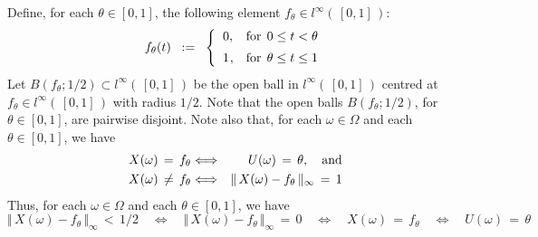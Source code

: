 \proof
Define, for each $\theta \in [0,1]$, the following element $f_{\theta} \in l^{\infty}(\,[0,1]\,)$:
\begin{equation*}
f_{\theta}(t)
\;\; := \;\;
	\left\{\begin{array}{cc}
	0, & \textnormal{for} \;\, 0 \leq t < \theta
	\\
	\overset{{\color{white}+}}{1}, & \textnormal{for} \;\, \theta \leq t \leq 1
	\end{array}\right.
\end{equation*}
Let $B(f_{\theta};1/2) \subset l^{\infty}(\,[0,1]\,)$ be the open ball in $l^{\infty}(\,[0,1]\,)$
centred at $f_{\theta} \in l^{\infty}(\,[0,1]\,)$ with radius $1/2$.
Note that the open balls $B(f_{\theta};1/2)$, for $\theta \in [0,1]$, are pairwise disjoint.
Note also that, for each $\omega \in \Omega$ and each $\theta \in [0,1]$, we have
\begin{eqnarray*}
X(\omega) \,=\, f_{\theta} &\Longleftrightarrow& U(\omega) \,=\, \theta, \quad\textnormal{and}
\\
X(\omega) \,\neq\, f_{\theta} &\Longleftrightarrow& \Vert\, X(\omega) - f_{\theta}\,\Vert_{\infty} \,=\, 1
\end{eqnarray*}
Thus, for each $\omega \in \Omega$ and each $\theta \in [0,1]$, we have
\begin{equation*}
\Vert\, X(\omega) - f_{\theta}\,\Vert_{\infty} \,<\, 1/2
\quad\Longleftrightarrow\quad
	\Vert\, X(\omega) - f_{\theta}\,\Vert_{\infty} \,=\, 0
\quad\Longleftrightarrow\quad
	X(\omega) \,=\, f_{\theta}
\quad\Longleftrightarrow\quad
	U(\omega) \,=\, \theta
\end{equation*}


